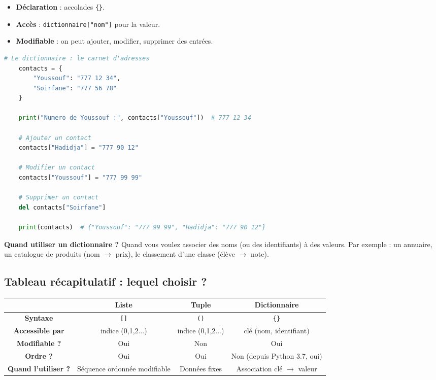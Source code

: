 \documentclass[12pt,a4paper]{article}
\begin{document}
\begin{itemize}
	\item [\ding{182}] \textbf{Déclaration} : accolades \texttt{\{\}}.
	\item [\ding{183}] \textbf{Accès} : \texttt{dictionnaire["nom"]} pour la valeur.
	\item [\ding{184}] \textbf{Modifiable} : on peut ajouter, modifier, supprimer des entrées.
\end{itemize}

\begin{lstlisting}[language=Python]
	# Le dictionnaire : le carnet d'adresses
	contacts = {
		"Youssouf": "777 12 34",
		"Soirfane": "777 56 78"
	}
	
	print("Numero de Youssouf :", contacts["Youssouf"])  # 777 12 34
	
	# Ajouter un contact
	contacts["Hadidja"] = "777 90 12"
	
	# Modifier un contact
	contacts["Youssouf"] = "777 99 99"
	
	# Supprimer un contact
	del contacts["Soirfane"]
	
	print(contacts)  # {"Youssouf": "777 99 99", "Hadidja": "777 90 12"}
\end{lstlisting}

\textbf{Quand utiliser un dictionnaire ?} Quand vous voulez associer des noms (ou des identifiants) à des valeurs. Par exemple : un annuaire, un catalogue de produits (nom \( \rightarrow \) prix), le classement d'une classe (élève \( \rightarrow \) note).

\subsection{Tableau récapitulatif : lequel choisir ?}

\begin{center}
	\begin{tabular}{|c|c|c|c|}
		\hline
		& \textbf{Liste} & \textbf{Tuple} & \textbf{Dictionnaire} \\
		\hline
		\textbf{Syntaxe} & \texttt{[]} & \texttt{()} & \texttt{\{\}} \\
		\textbf{Accessible par} & indice (0,1,2...) & indice (0,1,2...) & clé (nom, identifiant) \\
		\textbf{Modifiable ?} & Oui & Non & Oui \\
		\textbf{Ordre ?} & Oui & Oui & Non (depuis Python 3.7, oui) \\
		\textbf{Quand l'utiliser ?} & Séquence ordonnée modifiable & Données fixes & Association clé \( \rightarrow \) valeur \\
		\hline
	\end{tabular}
\end{center}
\end{document}

